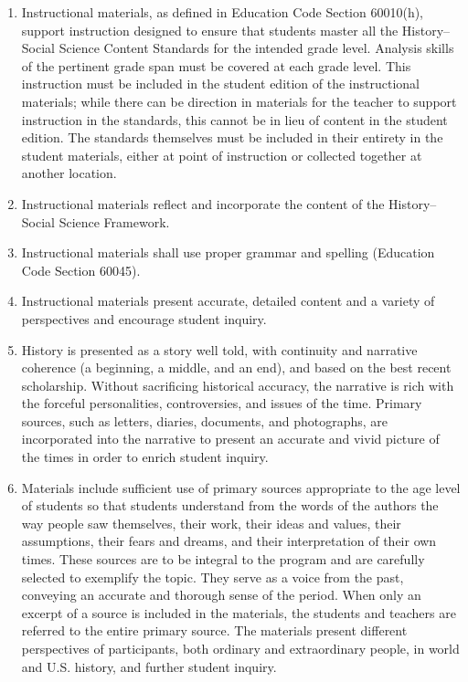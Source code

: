 \begin{enumerate}
\item 
Instructional materials, as defined in Education Code Section 60010(h), support instruction designed to ensure that students master all the History–Social Science Content Standards for the intended grade level. Analysis skills of the pertinent grade span must be covered at each grade level. This instruction must be included in the student edition of the instructional materials; while there can be direction in materials for the teacher to support instruction in the standards, this cannot be in lieu of content in the student edition. The standards themselves must be included in their entirety in the student materials, either at point of instruction or collected together at another location.
\item 
Instructional materials reflect and incorporate the content of the History–Social Science Framework.
\item 
Instructional materials shall use proper grammar and spelling (Education Code Section 60045).
\item 
Instructional materials present accurate, detailed content and a variety of perspectives and encourage student inquiry.
\item 
History is presented as a story well told, with continuity and narrative coherence (a beginning, a middle, and an end), and based on the best recent scholarship. Without sacrificing historical accuracy, the narrative is rich with the forceful personalities, controversies, and issues of the time. Primary sources, such as letters, diaries, documents, and photographs, are incorporated into the narrative to present an accurate and vivid picture of the times in order to enrich student inquiry.
\item 
Materials include sufficient use of primary sources appropriate to the age level of students so that students understand from the words of the authors the way people saw themselves, their work, their ideas and values, their assumptions, their fears and dreams, and their interpretation of their own times. These sources are to be integral to the program and are carefully selected to exemplify the topic. They serve as a voice from the past, conveying an accurate and thorough sense of the period. When only an excerpt of a source is included in the materials, the students and teachers are referred to the entire primary source. The materials present different perspectives of participants, both ordinary and extraordinary people, in world and U.S. history, and further student inquiry.

\end{enumerate}
